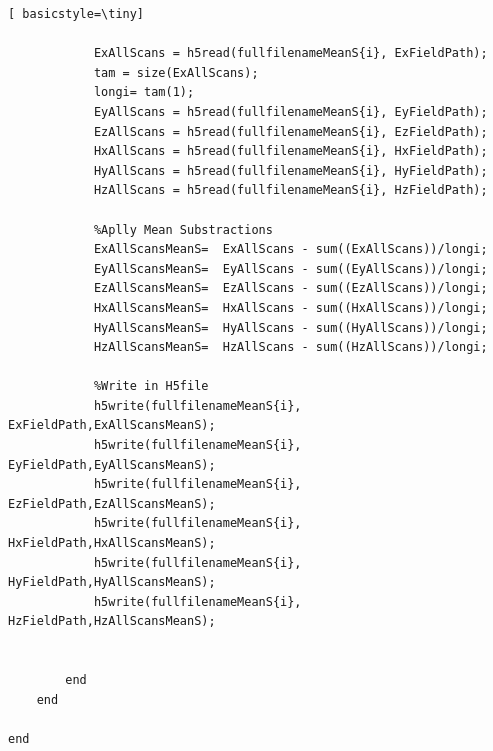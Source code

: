 \begin{lstlisting}[ basicstyle=\tiny]
            
            ExAllScans = h5read(fullfilenameMeanS{i}, ExFieldPath);
            tam = size(ExAllScans);
            longi= tam(1);
            EyAllScans = h5read(fullfilenameMeanS{i}, EyFieldPath);
            EzAllScans = h5read(fullfilenameMeanS{i}, EzFieldPath);
            HxAllScans = h5read(fullfilenameMeanS{i}, HxFieldPath);
            HyAllScans = h5read(fullfilenameMeanS{i}, HyFieldPath);
            HzAllScans = h5read(fullfilenameMeanS{i}, HzFieldPath);
            
            %Aplly Mean Substractions
            ExAllScansMeanS=  ExAllScans - sum((ExAllScans))/longi;
            EyAllScansMeanS=  EyAllScans - sum((EyAllScans))/longi;
            EzAllScansMeanS=  EzAllScans - sum((EzAllScans))/longi;
            HxAllScansMeanS=  HxAllScans - sum((HxAllScans))/longi;
            HyAllScansMeanS=  HyAllScans - sum((HyAllScans))/longi;
            HzAllScansMeanS=  HzAllScans - sum((HzAllScans))/longi;
 
            %Write in H5file
            h5write(fullfilenameMeanS{i}, ExFieldPath,ExAllScansMeanS);
            h5write(fullfilenameMeanS{i}, EyFieldPath,EyAllScansMeanS);
            h5write(fullfilenameMeanS{i}, EzFieldPath,EzAllScansMeanS);
            h5write(fullfilenameMeanS{i}, HxFieldPath,HxAllScansMeanS);
            h5write(fullfilenameMeanS{i}, HyFieldPath,HyAllScansMeanS);
            h5write(fullfilenameMeanS{i}, HzFieldPath,HzAllScansMeanS);
            
            
        end
    end
    
end

\end{lstlisting}


